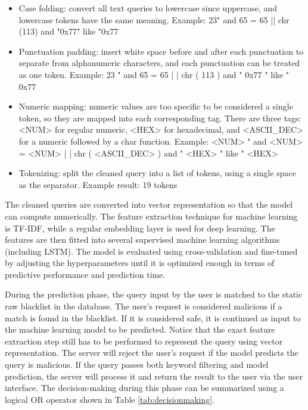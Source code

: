 \begin{itemize}[
    \setlength{\IEEElabelindent}{\dimexpr-\labelwidth-\labelsep}%
    \setlength{\itemindent}{\dimexpr\labelwidth+\labelsep}%
    \setlength{\listparindent}{\parindent}%
  ]
  \item Case folding: convert all text queries to lowercase since uppercase, and lowercase tokens have the same meaning. Example: 23" and 65 = 65 || chr (113) and "0x77" like "0x77
  \item Punctuation padding: insert white space before and after each punctuation to separate from alphanumeric characters, and each punctuation can be treated as one token. Example: 23 " and 65 = 65 | | chr ( 113 ) and " 0x77 " like " 0x77
  \item Numeric mapping: numeric values are too specific to be considered a single token, so they are mapped into each corresponding tag. There are three tags: <NUM> for regular numeric, <HEX> for hexadecimal, and <ASCII\_DEC> for a numeric followed by a char function. Example: <NUM> " and <NUM> = <NUM> | | chr ( <ASCII\_DEC> ) and " <HEX> " like " <HEX>
  \item Tokenizing: split the cleaned query into a list of tokens, using a single space as the separator. Example result: 19 tokens
\end{itemize}

\par The cleaned queries are converted into vector representation so that the model can compute numerically. The feature extraction technique for machine learning is TF-IDF, while a regular embedding layer is used for deep learning. The features are then fitted into several supervised machine learning algorithms (including LSTM). The model is evaluated using cross-validation and fine-tuned by adjusting the hyperparameters until it is optimized enough in terms of predictive performance and prediction time.

\par During the prediction phase, the query input by the user is matched to the static raw blacklist in the database. The user's request is considered malicious if a match is found in the blacklist. If it is considered safe, it is continued as input to the machine learning model to be predicted. Notice that the exact feature extraction step still has to be performed to represent the query using vector representation. The server will reject the user's request if the model predicts the query is malicious. If the query passes both keyword filtering and model prediction, the server will process it and return the result to the user via the user interface. The decision-making during this phase can be summarized using a logical OR operator shown in Table \ref{tab:decisionmaking}.

